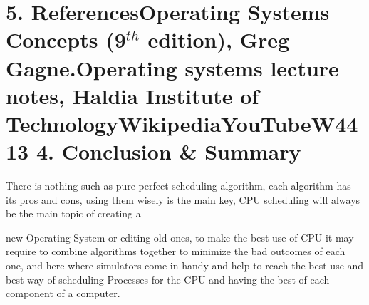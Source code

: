 \documentclass{article} %
\begin{document}
\section{ 5. References\newline  Operating Systems Concepts (9${}^{th}$ edition), Greg Gagne.\newline  Operating systems lecture notes, \newline  Haldia Institute of Technology\newline  Wikipedia\newline  YouTube\newline W4413 4. Conclusion \& Summary                                  }

\noindent There is nothing such as pure-perfect scheduling algorithm, each algorithm has its pros and cons, using them wisely is the main key, CPU scheduling will always be the main topic of creating a 

\noindent new Operating System or editing old ones, to make the best use of CPU it may require to combine algorithms together to minimize the bad outcomes of each one, and here where simulators come in handy and help to reach the best use and best way of scheduling Processes for the CPU and having the best of each component of a computer.

\noindent 
\section{}

\noindent 

\noindent 
\end{document}
